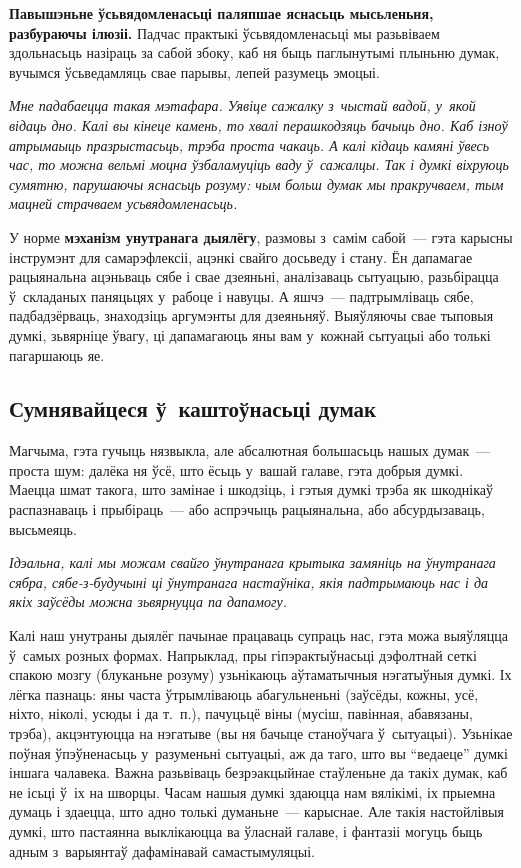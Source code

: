 \textbf{Павышэньне ўсьвядомленасьці паляпшае яснасьць мысьленьня, разбураючы ілюзіі.} Падчас практыкі ўсьвядомленасьці мы разьвіваем здольнасьць назіраць за сабой збоку, каб ня быць паглынутымі плыньню думак, вучымся ўсьведамляць свае парывы, лепей разумець эмоцыі.

\emph{Мне падабаецца такая мэтафара. Уявіце сажалку з~чыстай вадой, у~якой відаць дно. Калі вы кінеце камень, то хвалі перашкодзяць бачыць дно. Каб ізноў атрымаыць празрыстасьць, трэба проста чакаць. А калі кідаць камяні ўвесь час, то можна вельмі моцна ўзбаламуціць ваду ў~сажалцы. Так і думкі віхруюць сумятню, парушаючы яснасьць розуму: чым больш думак мы пракручваем, тым мацней страчваем усьвядомленасьць.}

У норме \textbf{мэханізм унутранага дыялёгу}, размовы з~самім сабой~--- гэта карысны інструмэнт для самарэфлексіі, ацэнкі свайго досьведу і стану. Ён дапамагае рацыянальна ацэньваць сябе і свае дзеяньні, аналізаваць сытуацыю, разьбірацца ў~складаных паняцьцях у~рабоце і навуцы. А яшчэ~--- падтрымліваць сябе, падбадзёрваць, знаходзіць аргумэнты для дзеяньняў. Выяўляючы свае тыповыя думкі, зьвярніце ўвагу, ці дапамагаюць яны вам у~кожнай сытуацыі або толькі пагаршаюць яе.

\subsection*{Сумнявайцеся ў~каштоўнасьці думак}

Магчыма, гэта гучыць нязвыкла, але абсалютная большасьць нашых думак~--- проста шум: далёка ня ўсё, што ёсьць у~вашай галаве, гэта добрыя думкі. Маецца шмат такога, што замінае і шкодзіць, і гэтыя думкі трэба як шкоднікаў распазнаваць і прыбіраць~--- або аспрэчыць рацыянальна, або абсурдызаваць, высьмеяць.

\emph{Ідэальна, калі мы можам свайго ўнутранага крытыка замяніць на ўнутранага сябра, сябе-з-будучыні ці ўнутранага настаўніка, якія падтрымаюць нас і да якіх заўсёды можна зьвярнуцца па дапамогу.}

Калі наш унутраны дыялёг пачынае працаваць супраць нас, гэта можа выяўляцца ў~самых розных формах. Напрыклад, пры гіпэрактыўнасьці дэфолтнай сеткі спакою мозгу (блуканьне розуму) узьнікаюць аўтаматычныя нэгатыўныя думкі. Іх лёгка пазнаць: яны часта ўтрымліваюць абагульненьні (заўсёды, кожны, усё, ніхто, ніколі, усюды і да т.~п.), пачуцьцё віны (мусіш, павінная, абавязаны, трэба), акцэнтуюцца на нэгатыве (вы ня бачыце станоўчага ў~сытуацыі). Узьнікае поўная ўпэўненасьць у~разуменьні сытуацыі, аж да таго, што вы ``ведаеце'' думкі іншага чалавека. Важна разьвіваць безрэакцыйнае стаўленьне да такіх думак, каб не ісьці ў~іх на шворцы. Часам нашыя думкі здаюцца нам вялікімі, іх прыемна думаць і здаецца, што адно толькі думаньне~--- карыснае. Але такія настойлівыя думкі, што пастаянна выклікаюцца ва ўласнай галаве, і фантазіі могуць быць адным з~варыянтаў дафамінавай самастымуляцыі. 

